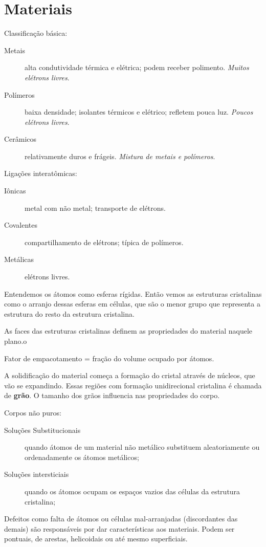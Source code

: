 
\section*{Materiais}

Classificação básica:
\begin{description}
\item[Metais] alta condutividade térmica e elétrica; podem receber polimento. \emph{Muitos elétrons livres}.
    \item[Polímeros] baixa densidade; isolantes térmicos e elétrico; refletem pouca luz. \emph{Poucos elétrons livres}.
    \item[Cerâmicos] relativamente duros e frágeis. \emph{Mistura de metais e polímeros}.
\end{description}

Ligações interatômicas:
\begin{description}
    \item[Iônicas] metal com não metal; transporte de elétrons.
    \item[Covalentes] compartilhamento de elétrons; típica de polímeros.
    \item[Metálicas] elétrons livres.
\end{description}

Entendemos os átomos como esferas rígidas. Então vemos as estruturas cristalinas como o arranjo dessas esferas em células, que são o menor grupo que representa a estrutura do resto da estrutura cristalina.

As faces das estruturas cristalinas definem as propriedades do material naquele plano.o

Fator de empacotamento = fração do volume ocupado por átomos.

A solidificação do material começa a formação do cristal através de núcleos, que vão se expandindo. Essas regiões com formação unidirecional cristalina é chamada de \textbf{grão}. O tamanho dos grãos influencia nas propriedades do corpo.

Corpos não puros:
\begin{description}
    \item[Soluções Substitucionais] quando átomos de um material não metálico substituem aleatoriamente ou ordenadamente os átomos metálicos;
    \item[Soluções intersticiais] quando os átomos ocupam os espaços vazios das células da estrutura cristalina;
\end{description}

Defeitos como falta de átomos ou células mal-arranjadas (discordantes das demais) são responsáveis por dar características aos materiais. Podem ser pontuais, de arestas, helicoidais ou até mesmo superficiais.

